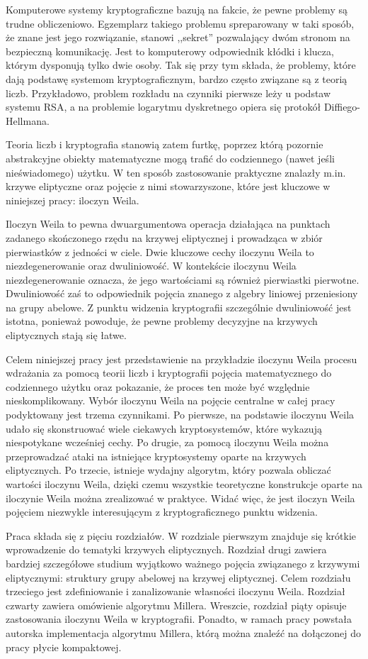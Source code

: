 \noindent
Komputerowe systemy kryptograficzne bazują na fakcie,
że pewne problemy są trudne obliczeniowo.
Egzemplarz takiego problemu spreparowany w taki sposób,
że znane jest jego rozwiązanie,
stanowi ,,sekret'' pozwalający dwóm stronom na bezpieczną komunikację.
Jest to komputerowy odpowiednik kłódki i klucza,
którym dysponują tylko dwie osoby.
Tak się przy tym składa,
że problemy, które dają podstawę systemom kryptograficznym,
bardzo często związane są z teorią liczb.
Przykładowo, problem rozkładu na czynniki pierwsze leży u podstaw systemu RSA,
a na problemie logarytmu dyskretnego opiera się protokół Diffiego-Hellmana.

\noindent
Teoria liczb i kryptografia stanowią zatem furtkę,
poprzez którą pozornie abstrakcyjne obiekty matematyczne
mogą trafić do codziennego (nawet jeśli nieświadomego) użytku.
W ten sposób zastosowanie praktyczne znalazły
m.in. krzywe eliptyczne
oraz pojęcie z nimi stowarzyszone,
które jest kluczowe w niniejszej pracy: iloczyn Weila.

\noindent
Iloczyn Weila to pewna dwuargumentowa operacja działająca
na punktach zadanego skończonego rzędu na krzywej eliptycznej
i prowadząca w zbiór pierwiastków z jedności w ciele.
Dwie kluczowe cechy iloczynu Weila to niezdegenerowanie
oraz dwuliniowość.
W kontekście iloczynu Weila niezdegenerowanie oznacza,
że jego wartościami są również pierwiastki pierwotne.
Dwuliniowość zaś to odpowiednik pojęcia znanego z algebry liniowej
przeniesiony na grupy abelowe.
Z punktu widzenia kryptografii
szczególnie dwuliniowość jest istotna, ponieważ powoduje,
że pewne problemy decyzyjne na krzywych eliptycznych stają się łatwe.

\noindent
Celem niniejszej pracy jest przedstawienie na przykładzie iloczynu Weila
procesu wdrażania za pomocą teorii liczb i kryptografii
pojęcia matematycznego do codziennego użytku
oraz pokazanie, że proces ten może być względnie nieskomplikowany.
Wybór iloczynu Weila na pojęcie centralne w całej pracy
podyktowany jest trzema czynnikami.
Po pierwsze, na podstawie iloczynu Weila udało się skonstruować
wiele ciekawych kryptosystemów,
które wykazują niespotykane wcześniej cechy.
Po drugie, za pomocą iloczynu Weila można przeprowadzać
ataki na istniejące kryptosystemy oparte na krzywych eliptycznych.
Po trzecie, istnieje wydajny algorytm,
który pozwala obliczać wartości iloczynu Weila,
dzięki czemu wszystkie teoretyczne konstrukcje oparte na iloczynie Weila
można zrealizować w praktyce.
Widać więc, że jest iloczyn Weila pojęciem niezwykle interesującym
z kryptograficznego punktu widzenia.

\noindent
Praca składa się z pięciu rozdziałów.
W rozdziale pierwszym znajduje się krótkie wprowadzenie
do tematyki krzywych eliptycznych.
Rozdział drugi zawiera bardziej szczegółowe studium
wyjątkowo ważnego pojęcia związanego z krzywymi eliptycznymi:
struktury grupy abelowej na krzywej eliptycznej.
Celem rozdziału trzeciego
jest zdefiniowanie i zanalizowanie własności iloczynu Weila.
Rozdział czwarty zawiera omówienie algorytmu Millera.
Wreszcie, rozdział piąty opisuje zastosowania iloczynu Weila w kryptografii.
Ponadto, w ramach pracy powstała autorska implementacja algorytmu Millera,
którą można znaleźć na dołączonej do pracy płycie kompaktowej.
